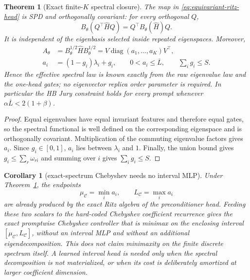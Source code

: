 \documentclass[11pt]{article}
\newtheorem{theorem}{Theorem}
\newtheorem{corollary}{Corollary}
\begin{document}
\begin{theorem}[Exact finite-$K$ spectral closure]
\label{thm:equivariant-ritz-closure}
The map in \eqref{eq:equivariant-ritz-head} is SPD and orthogonally covariant:
for every orthogonal $Q$,
\[
 B_\theta(Q^\top\widehat H Q)=Q^\top B_\theta(\widehat H)Q.
\]
It is independent of the eigenbasis selected inside repeated eigenspaces.
Moreover,
\begin{equation}
\begin{aligned}
 A_\theta
 &=B_\theta^{1/2}\widehat H B_\theta^{1/2}
 =V\operatorname{diag}(a_1,\ldots,a_K)V^\top,\\
 a_i&=(1-g_i)\lambda_i+g_i,
 \qquad 0<a_i\leq\overline L,
 \qquad \sum_i g_i\leq S.
\end{aligned}
 \label{eq:effective-pushforward-finite}
\end{equation}
Hence the effective spectral law is known exactly from the raw eigenvalue law
and the one-head gates; no eigenvector replica order parameter is required.
In particular the HB Jury constraint holds for every prompt whenever
$\alpha\overline L<2(1+\beta)$.
\end{theorem}
\begin{proof}
Equal eigenvalues have equal invariant features and therefore equal gates, so
the spectral functional is well defined on the corresponding eigenspace and
is orthogonally covariant.  Multiplication of the commuting eigenvalue factors
gives $a_i$.  Since $g_i\in[0,1]$, $a_i$ lies between $\lambda_i$ and $1$.
Finally, the union bound gives
$g_i\leq\sum_r\omega_{ri}$ and summing over $i$ gives
$\sum_i g_i\leq S$.
\end{proof}

\begin{corollary}[exact-spectrum Chebyshev needs no interval MLP]
\label{cor:exact-head-chebyshev}
Under Theorem~\ref{thm:equivariant-ritz-closure}, the endpoints
\[
    \mu_{\mathcal C}=\min_i a_i,
    \qquad
    L_{\mathcal C}=\max_i a_i
\]
are already produced by the exact Ritz algebra of the preconditioner head.
Feeding these two scalars to the hard-coded Chebyshev coefficient recurrence
gives the exact promptwise Chebyshev controller that is minimax on the
enclosing interval $[\mu_{\mathcal C},L_{\mathcal C}]$, without an interval
MLP and without an additional eigendecomposition.  This does not claim
minimaxity on the finite discrete spectrum itself.  A learned interval head is
needed only when the spectral decomposition is not materialized, or when its
cost is deliberately amortized at larger coefficient dimension.
\end{corollary}
\end{document}
